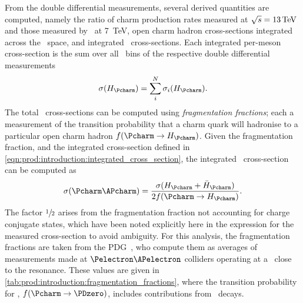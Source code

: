 From the double differential measurements, several derived quantities are 
computed, namely the ratio of charm production rates measured at $\sqrts = 
\SI{13}{\TeV}$ and those measured by \lhcb\ at \SI{7}{\TeV}, open charm hadron 
cross-sections integrated across the \pTy\ space, and integrated \ccbar\ 
cross-sections.
Each integrated per-meson cross-section is the sum over all \pTy\ bins of the 
respective double differential measurements
\begin{equation}
  \xsec{(\PHc)} =
    \sum_{i}^{N} \xsec_{i}(\PHc).
  \label{eqn:prod:introduction:integrated_cross_section}
\end{equation}
The total \ccbar\ cross-sections can be computed using \emph{fragmentation 
  fractions}; each a measurement of the transition probability that a charm 
quark will hadronise to a particular open charm hadron $f(\cToHc)$.
Given the fragmentation fraction, and the integrated cross-section defined in 
\cref{eqn:prod:introduction:integrated_cross_section}, the integrated \ccbar\ 
cross-section can be computed as
\begin{equation}
  \xsec{(\ccbar)} = \frac{\xsec(\PHc + \APHc)}{2f(\cToHc)}.
  \label{eqn:prod:introduction:ccbar_cross_section}
\end{equation}
The factor $\sfrac{1}{2}$ arises from the fragmentation fraction not accounting 
for charge conjugate states, which have been noted explicitly here in the 
expression for the measured cross-section to avoid ambiguity.
For this analysis, the fragmentation fractions are taken from the 
\ac{PDG}~\cite{PDG2008}, who compute them as averages of measurements made at 
$\Pelectron\APelectron$ colliders operating at a \sqrts\ close to the 
\PUpsilonFourS resonance.
These values are given in \cref{tab:prod:introduction:fragmentation_fractions}, 
where the transition probability for \PDzero, $f(\decay{\Pcharm}{\PDzero})$, 
includes contributions from \DstToDzpi\ decays.

\begin{table}
  \caption[Charm hadron fragmentation fractions]{%
    Charm hadron fragmentation fractions~\cite{PDG2008}.
    Here, \PHc\ does not include the charge conjugate state.
  }
  \label{tab:prod:introduction:fragmentation_fractions}
  \centering
  
\end{table}


